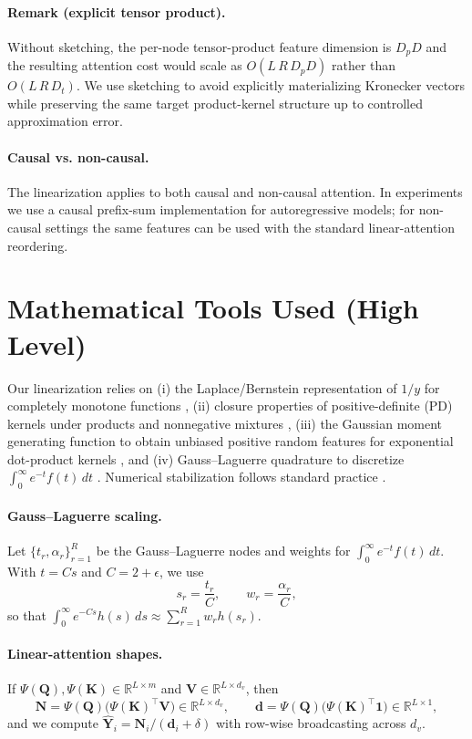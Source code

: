 \documentclass{article}
\begin{document}
\paragraph{Remark (explicit tensor product).}
Without sketching, the per-node tensor-product feature dimension is $D_pD$ and the resulting attention cost would scale as $O(L\,R\,D_pD)$ rather than $O(L\,R\,D_t)$. We use sketching to avoid explicitly materializing Kronecker vectors while preserving the same target product-kernel structure up to controlled approximation error.

\paragraph{Causal vs. non-causal.}
The linearization applies to both causal and non-causal attention. In experiments we use a causal prefix-sum implementation for autoregressive models; for non-causal settings the same features can be used with the standard linear-attention reordering.

\section{Mathematical Tools Used (High Level)}
\label{app:tools}

Our linearization relies on
(i) the Laplace/Bernstein representation of $1/y$ for completely monotone functions
\citep{widder1941laplace,schilling2012},
(ii) closure properties of positive-definite (PD) kernels under products and nonnegative mixtures
\citep{aronszajn1950,scholkopf2002learning},
(iii) the Gaussian moment generating function to obtain unbiased positive random features for exponential dot-product kernels
\citep{performers},
and (iv) Gauss--Laguerre quadrature to discretize
$\int_0^\infty e^{-t}f(t)\,dt$
\citep{davis1984,gautschi2004}.
Numerical stabilization follows standard practice \citep{higham2002}.

\paragraph{Gauss--Laguerre scaling.}
Let $\{t_r,\alpha_r\}_{r=1}^R$ be the Gauss--Laguerre nodes and weights for
$\int_0^\infty e^{-t}f(t)\,dt$.
With $t=Cs$ and $C=2+\epsilon$, we use
\[
s_r=\frac{t_r}{C},
\qquad
w_r=\frac{\alpha_r}{C},
\]
so that
$\int_0^\infty e^{-Cs}h(s)\,ds
\approx
\sum_{r=1}^R w_r h(s_r)$.

\paragraph{Linear-attention shapes.}
If
$\Psi(\mathbf{Q}),\Psi(\mathbf{K})\in\mathbb{R}^{L\times m}$
and
$\mathbf{V}\in\mathbb{R}^{L\times d_v}$,
then
\[
\mathbf{N}
=
\Psi(\mathbf{Q})
\bigl(\Psi(\mathbf{K})^\top \mathbf{V}\bigr)
\in
\mathbb{R}^{L\times d_v},
\qquad
\mathbf{d}
=
\Psi(\mathbf{Q})
\bigl(\Psi(\mathbf{K})^\top \mathbf{1}\bigr)
\in
\mathbb{R}^{L\times 1},
\]
and we compute
$\widehat{\mathbf{Y}}_i = \mathbf{N}_i/(\mathbf{d}_i+\delta)$
with row-wise broadcasting across $d_v$.
\end{document}
